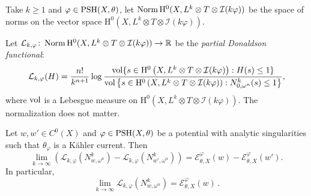 \begin{definition}\label{def:Bergman:L942}
    Take $k\geq 1$ and $\varphi\in \mathrm{PSH}(X,\theta)$, let $\operatorname{Norm} \mathrm{H}^0(X,L^k \otimes T \otimes \mathcal{I}(k\varphi))$ be the space of norms on the vector space $\mathrm{H}^0(X,L^k \otimes T \otimes \mathcal{I}(k\varphi))$.

    Let $\mathcal{L}_{k,\varphi} \colon \operatorname{Norm} \mathrm{H}^0(X,L^k \otimes T \otimes \mathcal{I}(k\varphi)) \to \mathbb R$ be the \emph{partial Donaldson functional}:
\begin{equation}
\mathcal{L}_{k,\varphi}(H) = \frac{n!}{k^{n+1}} \log \frac{\operatorname{vol}\{s \in \mathrm{H}^0\left(X,L^k \otimes T \otimes \mathcal{I}(k\varphi)\right) : H(s) \leq 1\}}{\operatorname{vol} \left\{s\in \mathrm{H}^0\left(X,L^k \otimes T \otimes \mathcal{I}(k\varphi)\right) : N^k_{0,\omega^n}(s) \leq 1\right\}},
\end{equation}
where $\operatorname{vol}$ is a Lebesgue measure on $\mathrm{H}^0(X,L^k \otimes T \otimes \mathcal{I}(k\varphi))$. The normalization does not matter.
\end{definition}

\begin{proposition}\label{prop:quant_I_smooth}
Let $w,w' \in C^0(X)$ and $\varphi \in \mathrm{PSH}(X,\theta)$ be a potential with analytic singularities such that $\theta_{\varphi}$ is a Kähler current. Then
\begin{equation}\label{eq:LdiffonXsmoothmeasure}
\lim_{k\to\infty} \left(\mathcal{L}_{k,\varphi}(N^k_{w,\omega^n}) - \mathcal{L}_{k,\varphi}(N^k_{w',\omega^n}) \right)= \mathcal{E}_{\theta,X}^{\varphi}(w)-\mathcal{E}_{\theta,X}^{\varphi}(w').
\end{equation}
In particular,
\begin{equation}\label{eq:LdiffonXsmoothmeasure2}
\lim_{k\to\infty}\mathcal{L}_{k,\varphi}(N^k_{w,\omega^n})=\mathcal{E}_{\theta,X}^{\varphi}(w)\,.
\end{equation}
\end{proposition}



